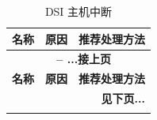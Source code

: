 \documentclass[main\_\_CN.tex]{subfiles}
\begin{document}
\begin{longtable}[c]{ |p{5cm}|p{5cm}|p{5cm}| }
    \caption{DSI 主机中断}
    \label{tab:dsi-host-interrupt}\\\hline

    \rowcolor{lightgray}
    \textbf{名称} & \textbf{原因} & \textbf{推荐处理方法}  \\\hline
    \endfirsthead


    \multicolumn{3}{c}{\bfseries \tablename\ \thetable{} -- ...接上页}\\\hline
    \rowcolor{lightgray}
    \textbf{名称} & \textbf{原因} & \textbf{推荐处理方法}  \\\hline
    \endhead

    \multicolumn{3}{r}{\textbf{见下页...}} \\
    \endfoot

    \endlastfoot


\end{longtable}
\end{document}
